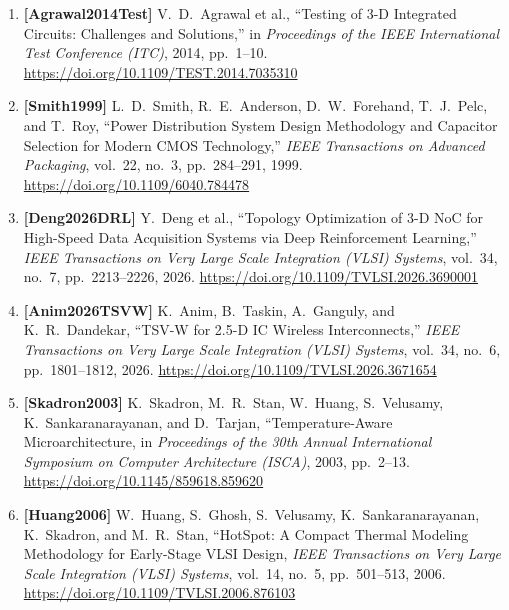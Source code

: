 \begin{enumerate}
    \item \textbf{[Agrawal2014Test]} V.~D.~Agrawal et al., ``Testing of 3-D Integrated Circuits: Challenges and Solutions,'' in \emph{Proceedings of the IEEE International Test Conference (ITC)}, 2014, pp.~1--10. \url{https://doi.org/10.1109/TEST.2014.7035310}
    \item \textbf{[Smith1999]} L.~D.~Smith, R.~E.~Anderson, D.~W.~Forehand, T.~J.~Pelc, and T.~Roy, ``Power Distribution System Design Methodology and Capacitor Selection for Modern CMOS Technology,'' \emph{IEEE Transactions on Advanced Packaging}, vol.~22, no.~3, pp.~284--291, 1999. \url{https://doi.org/10.1109/6040.784478}
    \item \textbf{[Deng2026DRL]} Y.~Deng et al., ``Topology Optimization of 3-D NoC for High-Speed Data Acquisition Systems via Deep Reinforcement Learning,'' \emph{IEEE Transactions on Very Large Scale Integration (VLSI) Systems}, vol.~34, no.~7, pp.~2213--2226, 2026. \url{https://doi.org/10.1109/TVLSI.2026.3690001}
    \item \textbf{[Anim2026TSVW]} K.~Anim, B.~Taskin, A.~Ganguly, and K.~R.~Dandekar, ``TSV-W for 2.5-D IC Wireless Interconnects,'' \emph{IEEE Transactions on Very Large Scale Integration (VLSI) Systems}, vol.~34, no.~6, pp.~1801--1812, 2026. \url{https://doi.org/10.1109/TVLSI.2026.3671654}

    \item \textbf{[Skadron2003]} K.~Skadron, M.~R.~Stan, W.~Huang, S.~Velusamy, K.~Sankaranarayanan, and D.~Tarjan, ``Temperature-Aware Microarchitecture, in \emph{Proceedings of the 30th Annual International Symposium on Computer Architecture (ISCA)}, 2003, pp.~2--13. \url{https://doi.org/10.1145/859618.859620}
    \item \textbf{[Huang2006]} W.~Huang, S.~Ghosh, S.~Velusamy, K.~Sankaranarayanan, K.~Skadron, and M.~R.~Stan, ``HotSpot: A Compact Thermal Modeling Methodology for Early-Stage VLSI Design, \emph{IEEE Transactions on Very Large Scale Integration (VLSI) Systems}, vol.~14, no.~5, pp.~501--513, 2006. \url{https://doi.org/10.1109/TVLSI.2006.876103}
\end{enumerate}
